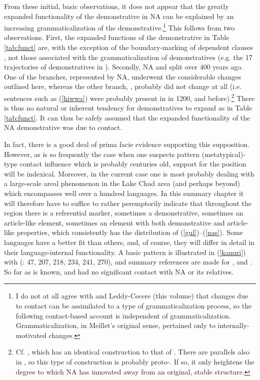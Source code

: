 \documentclass[output=paper]{langsci/langscibook}
\begin{document}
From these initial, basic observations, it does not appear that the greatly expanded functionality of the demonstrative in NA can be explained by an increasing {grammaticalization} of the demonstrative.\footnote{I do not at all agree with \citet{HeineKuteva2011} and Leddy-Cecere (this volume) that changes due to contact can be assimilated to a type of {grammaticalization} process, so the following contact-based account is independent of {grammaticalization}. Grammaticalization, in Meillet's original sense, pertained only to internally-motivated changes.} This follows from two observations. First, the expanded functions of the demonstrative in Table \ref{tab:funct} are, with the exception of the boundary-marking of dependent clauses , not those associated with the {grammaticalization} of {demonstratives} (e.g. the 17 trajectories of {demonstratives} in \citealt{Diessel1999}). Secondly, NA and  split over 400 years ago. One of the branches, represented by NA, underwent the considerable changes outlined here, whereas the other branch, , probably did not change at all (i.e. sentences such as (\ref{hiwwa}) were probably present in  in 1200, and before).\footnote{Cf. , which has an identical construction to that of . There are parallels also in  , so this type of construction is probably proto-. If so, it only heightens the degree to which NA has innovated away from an original, stable structure.} There is thus no natural or inherent tendency for {demonstratives} to expand as in Table \ref{tab:funct}. It can thus be safely assumed that the expanded functionality of the NA demonstrative was due to contact.

In fact, there is a good deal of prima facie evidence supporting this supposition. However, as is so frequently the case when one suspects pattern (metatypical)-type contact influence which is probably centuries old, support for the position will be indexical. Moreover, in the current case one is most probably dealing with a large-scale areal phenomenon in the {Lake Chad} area (and perhaps beyond) which encompasses well over a hundred languages. In this summary chapter it will therefore have to suffice to rather peremptorily indicate that throughout the region there is a referential marker, sometimes a demonstrative, sometimes an article-like element, sometimes an element with both demonstrative and article-like properties, which consistently has the distribution of (\ref{gul})–(\ref{nas}). Some languages have a better fit than others, and, of course, they will differ in detail in their language-internal functionality. A basic pattern is illustrated in (\ref{kanuri}) with  (\citealt{Hutchison1981}: 47, 207, 218, 234, 241, 270), and summary references are made for ,  and . So far as is known,  and  had no significant contact with NA or its  relatives.
\end{document}
